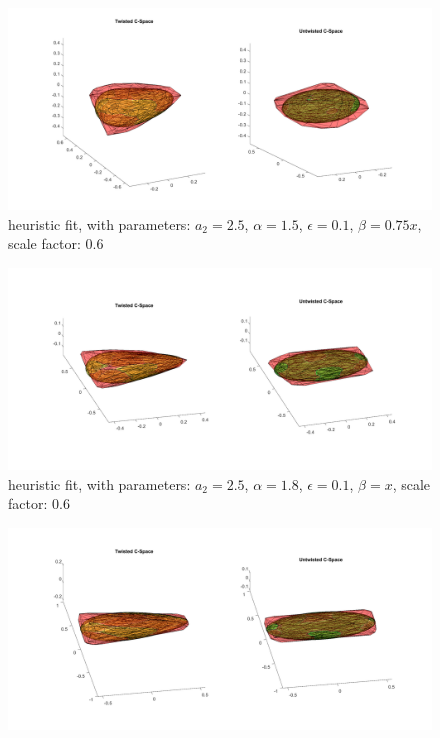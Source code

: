 \documentclass{article}
\begin{document}
\begin{enumerate}
\begin{figure}
\includegraphics[scale = 0.25]{twist-untwist_c-space_fit_scaled_ratio1_5.png}
\caption{heuristic fit, with parameters: $a_2 = 2.5$, $\alpha = 1.5$, $\epsilon = 0.1$, $\beta = 0.75x$, scale factor: 0.6}
\label{fit_scaled1.5}
\end{figure}
\begin{figure}
\includegraphics[scale = 0.25]{twist-untwist_c-space_fit_scaled_ratio1_8.png}
\caption{heuristic fit, with parameters: $a_2 = 2.5$, $\alpha = 1.8$, $\epsilon = 0.1$, $\beta = x$, scale factor: 0.6}
\label{fit_scaled1.8}
\end{figure}
\begin{figure}
\includegraphics[scale = 0.25]{twist-untwist_c-space_fit_scaled_ratio2_2.png}

\end{figure}
\end{enumerate}
\end{document}
